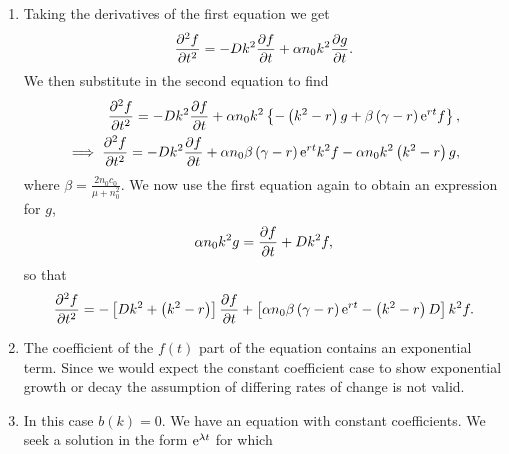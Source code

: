 \documentclass[a4paper, 12pt]{article}
\begin{document}
\begin{enumerate}[label={\bf \arabic{*}.\;}, ref={\arabic{*}},itemsep=3ex, left=0ex]
{\begin{enumerate}[label=(\alph*)]
{            \begin{equation}
              \frac{2n_0 c_0}{\mu + n_0^2}\left(1 - \frac{r}{\gamma}\right)\e^{rt}f(t)\sum_{k}\e^{\i kx} + \frac{r}{\gamma}g(t)\sum_{k}\e^{\i kx}.
            \end{equation}
            Collecting all $\order(\epsilon)$ terms we find for each $k$ that
            \begin{align}
              \pd{f}{t} &= -Dk^2 f +\alpha n_0 k^2 g,\\
              \pd{g}{t} &= -\left(k^2 -r\right)g  + \frac{2n_0 c_0}{\mu + n_0^2}\left(\gamma -r\right)\e^{rt}f.
            \end{align}
          }
        \item{
            Taking the derivatives of the first equation we get
            \begin{equation}
              \pdd{f}{t} = -Dk^2 \pd{f}{t} +\alpha n_0 k^2 \pd{g}{t}.
            \end{equation}
            We then substitute in the second equation to find
            \begin{align}
              \pdd{f}{t} = -Dk^2 \pd{f}{t} +\alpha n_0 k^2\left\{-\left(k^2 -r\right)g  + \beta\left(\gamma - r\right)\e^{rt}f\right\},\\
              \implies \pdd{f}{t} = -Dk^2 \pd{f}{t}+\alpha n_0 \beta\left(\gamma - r\right)\e^{rt}k^2f - \alpha n_0 k^2\left(k^2 -r\right)g,
            \end{align}
            where $\beta = \frac{2n_0 c_0}{\mu + n_0^2}$.
            We now use the first equation again to obtain an expression for $g$,
            \begin{equation}
              \alpha n_0 k^2 g =   \pd{f}{t} + Dk^2 f,
            \end{equation}
            so that
            \begin{align}
              \pdd{f}{t} = -\left[Dk^2 + \left(k^2 -r\right)\right]\pd{f}{t}+\left[\alpha n_0 \beta\left(\gamma - r\right)\e^{rt} - \left(k^2 -r\right)D\right]k^2f.
            \end{align}
          }
        \item{
            The coefficient of the $f(t)$ part of the equation contains an exponential term. Since we would expect the constant coefficient case to show exponential growth or decay the assumption of differing rates of change is not valid.
          }
        \item{
            In this case $b(k)=0$. We have an equation with constant coefficients. We seek a solution in the form $\mathrm{e}^{\lambda t}$ for which
}
\end{enumerate}}
\end{enumerate}
\end{document}
